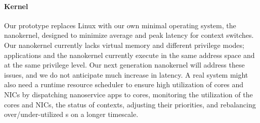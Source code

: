 \paragraph{Kernel} Our prototype replaces Linux with our own minimal operating system, the nanokernel, designed to minimize average and peak latency for context switches. Our nanokernel currently lacks virtual memory and different privilege modes;
applications and the nanokernel currently execute in the same address space and at the same privilege level. Our next generation nanokernel will address these issues, and we do not anticipate much increase in latency. A real system might also need a runtime resource scheduler to ensure high utilization of \name{} cores and NICs by dispatching nanoservice apps to cores, monitoring the utilization of the cores and NICs, the status of contexts, adjusting their priorities, and rebalancing over/under-utilized \name{}s on a longer timescale. 




